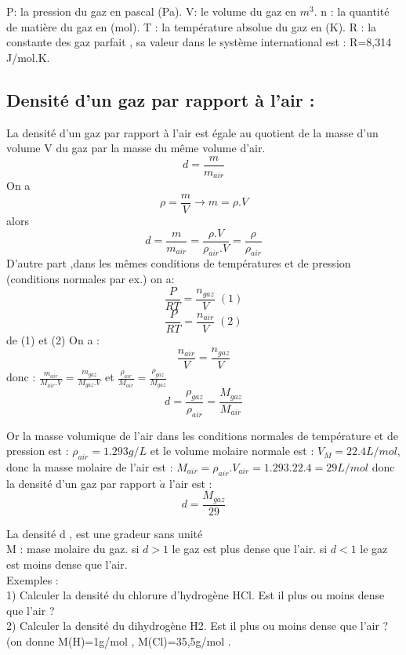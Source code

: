 \documentclass[12pt]{article}
\begin{document}
P: la pression du gaz en pascal (Pa).
V: le volume du gaz en $m^3$.
n : la quantité de matière du gaz en (mol).
T : la température absolue du gaz en (K).
R : la constante des gaz parfait , sa valeur dans le système international est : R=8,314 J/mol.K.

\subsection{Densité d'un gaz par rapport à l'air :  }
La densité d'un gaz par rapport à l'air est égale au quotient de la masse d'un volume V du gaz par la masse du même
volume d'air.
$$d = \frac{m}{m_{air}}$$
On a $$\rho = \frac{m}{V} \rightarrow  m = \rho.V$$
alors $$d = \frac{m}{m_{air}} = \frac{\rho.V}{\rho_{air}.V} = \frac{\rho}{\rho_{air}}$$
D'autre part ,dans les mêmes conditions de températures et de pression (conditions normales par ex.) on a:
$$\frac{P}{RT} = \frac{n_{gaz}}{V} \; (1)$$
$$\frac{P}{RT} = \frac{n_{air}}{V} \; (2)$$
de (1) et (2) On a :  $$  \frac{n_{air}}{V}= \frac{n_{gaz}}{V}$$
donc : $  \frac{m_{air}}{M_{air}.V}= \frac{m_{gaz}}{M_{gaz}.V}$
et $\frac{\rho_{air}}{M_{air}}= \frac{\rho_{gaz}}{M_{gaz}}$
$$ d = \frac{\rho_{gaz}}{\rho_{air}} = \frac{M_{gaz}}{M_{air}}$$

Or la masse volumique de l'air dans les conditions normales de température et de pression est : $\rho_{air} = 1.293g/L$ et le volume molaire normale est : $V_M=22.4L/mol$, donc la masse molaire de l'air est : $M_{air} =\rho_{air}.V_{air}  = 1.293 . 22.4  = 29 L/mol$
donc la densité d'un gaz par rapport $\grave{a}$ l'air est : $$d = \frac{M_{gaz}}{29}$$

La densité d , est une gradeur sans unité 
\\M : mase molaire du gaz.
si $d>1$ le gaz est plus dense que l'air.
si $d<1$ le gaz est moins dense que l'air.
\\Exemples :
\\1) Calculer la densité du chlorure d’hydrogène HCl. Est il plus ou moins dense que l’air ?
\\2) Calculer la densité du dihydrogène H2. Est il plus ou moins dense que l’air ?
(on donne M(H)=1g/mol , M(Cl)=35,5g/mol .
\end{document}

